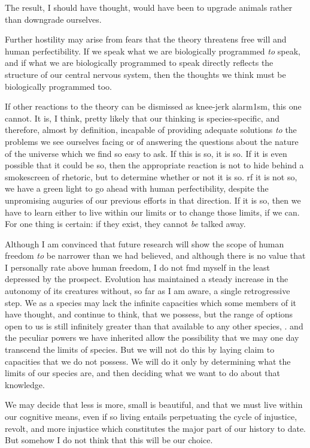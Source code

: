 The result, I should have thought, would have been to upgrade animals rather than downgrade ourselves.

Further hostility may arise from fears that the theory threatens free will and human perfectibility. If we speak what we are biologically programmed \textit{to} speak, and if what we are biologically programmed to speak directly reflects the structure of our central nervous system, then the thoughts we think must be biologically programmed too.

If other reactions to the theory can be dismissed as knee-jerk alarm1sm, this one cannot. It is, I think, pretty likely that our think\-ing is species-specific, and therefore, almost by definition, incapable of providing adequate solutions \textit{to }the problems we see ourselves facing or of answering the questions about the nature of the universe which we find so easy to ask. If this is so, it is so. If it is even possible that it could be so, then the appropriate reaction is not to hide behind a smokescreen of rhetoric, but to determine whether or not it is so. rf it is not so, we have a green light to go ahead with human perfectibility, despite the unpromising auguries of our previous efforts in that direc\-tion. If it is so, then we have to learn either to live within our limits
or to change those limits, if we can. For one thing is certain: if they exist, they cannot \textit{be} talked away.

Although I am convinced that future research will show the scope of human freedom \textit{to} be narrower than we had believed, and although there is no value that I personally rate above human freedom, I do not fmd myself in the least depressed by the prospect. Evolution has maintained a steady increase in the autonomy of its creatures with\-out, so far as I am aware, a single retrogressive step. We as a species may lack the infinite capacities which some members of it have thought,
and continue to think, that we possess, but the range of options open to us is still infinitely greater than that available to any other species, . and the peculiar powers we have inherited allow the possibility that we may one day transcend the limits of species. But we will not do this by laying claim to capacities that we do not possess. We will do it only by determining what the limits of our species are, and then decid\-ing what we want to do about that knowledge.

We may decide that less is more, small is beautiful, and that we must live within our cognitive means, even if so living entails perpetu\-ating the cycle of injustice, revolt, and more injustice which constitutes the major part of our history to date. But somehow I do not think that this will be our choice.

